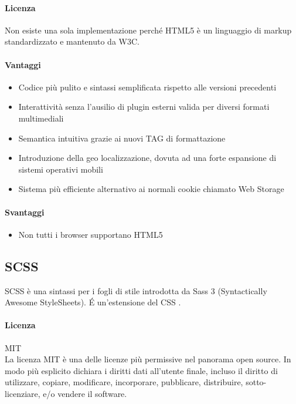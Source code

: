 \paragraph{Licenza}  
Non esiste una sola implementazione perché HTML5 è un linguaggio di markup standardizzato e mantenuto da W3C.



\paragraph{Vantaggi}
\begin{itemize}
	\item Codice più pulito e sintassi semplificata rispetto alle versioni precedenti
	\item Interattività senza l’ausilio di plugin esterni valida per diversi formati multimediali
	\item Semantica intuitiva grazie ai nuovi TAG di formattazione
	\item Introduzione della geo localizzazione, dovuta ad una forte espansione di sistemi operativi mobili
	\item Sistema più efficiente alternativo ai normali cookie chiamato Web Storage 

\end{itemize}

\paragraph{Svantaggi} 
\begin{itemize}
	\item Non tutti i browser supportano HTML5
\end{itemize}

\subsection{SCSS}

SCSS è una sintassi per i fogli di stile introdotta da Sass 3 (Syntactically Awesome StyleSheets). \'E un'estensione del CSS .

\paragraph{Licenza} MIT \\
La licenza MIT è una delle licenze più permissive nel panorama open
source. In modo più esplicito dichiara i diritti dati all'utente
finale, incluso il diritto di utilizzare, copiare, modificare,
incorporare, pubblicare, distribuire, sotto-licenziare, e/o vendere il
software. 

